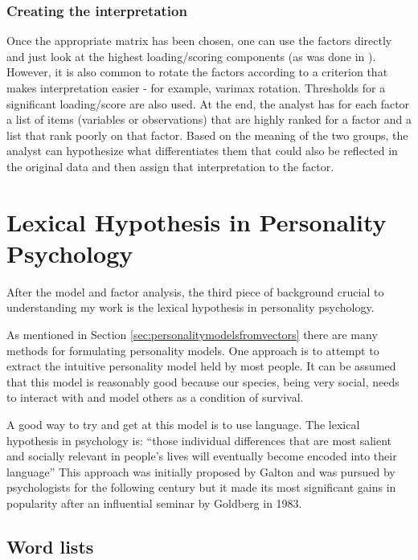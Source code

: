 \subsubsection{Creating the interpretation}

\label{sec:bg:factorinterpretation}
Once the appropriate matrix has been chosen, one can use the factors directly
and just look at the highest loading/scoring components (as was done in 
\citep{Samsonovich2010}). However, it is
also common to rotate the factors according to a criterion that makes 
interpretation easier - for example, varimax rotation. Thresholds for a 
significant loading/score are also used. At the end, the analyst has for each
factor a list of items (variables or observations) that are highly ranked for a 
factor and a list that rank poorly on that factor. Based on the meaning of the 
two groups, the analyst can hypothesize what differentiates them that could also
be reflected in the original data and then assign that interpretation to the 
factor.

\section{Lexical Hypothesis in Personality Psychology}

After the \modelname{} model and factor analysis, the third piece of background
crucial to understanding my work is the lexical hypothesis in personality 
psychology.

As mentioned in Section \ref{sec:personalitymodelsfromvectors} there are many
methods for formulating personality models. One approach is to attempt to extract the 
intuitive personality model held by most people. It can be assumed that this
model is reasonably good because our species, being very social, needs to 
interact with and model others as a condition of survival. 

A good way to try and get at this model is to use language. The lexical 
hypothesis in psychology is:
``those individual differences that are most salient and socially relevant in
people's lives will eventually become encoded into their language'' 
\citep{Goldberg1982} This approach was initially proposed by 
Galton \citep{Galton1884} and was pursued by psychologists for the following century
but it made its most significant gains in popularity after an influential seminar
by Goldberg in 1983. \citep{Deary2009}

\subsection{Word lists}

